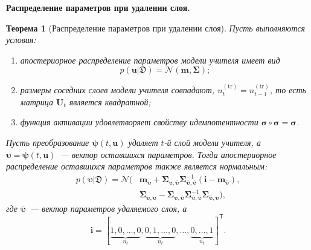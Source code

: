 \documentclass{dissert}
\newcommand{\paragraph}[1]{\noindent\textbf{#1}\quad}
\newtheorem{theorem}{Теорема}
\begin{document}
\paragraph{Распределение параметров при удалении слоя.}
\begin{theorem}[Распределение параметров при удалении слоя]
Пусть выполняются условия:
\begin{enumerate}
    \item апостериорное распределение параметров модели учителя имеет вид
    \[
        p(\mathbf{u}|\mathfrak{D})=\mathcal{N}(\mathbf{m},\boldsymbol{\Sigma});
    \]
    \item размеры соседних слоев модели учителя совпадают, $n_t^{(\mathrm{tr})}=n_{t-1}^{(\mathrm{tr})}$, то есть матрица $\mathbf{U}_t$ является квадратной;
    \item функция активации удовлетворяет свойству идемпотентности $\boldsymbol{\sigma}\circ\boldsymbol{\sigma}=\boldsymbol{\sigma}$.
\end{enumerate}
Пусть преобразование $\boldsymbol{\psi}(t,\mathbf{u})$ удаляет $t$-й слой модели учителя, а $\boldsymbol{\upsilon}=\boldsymbol{\psi}(t,\mathbf{u})$~--- вектор оставшихся параметров.
Тогда апостериорное распределение оставшихся параметров также является нормальным:
\[
\begin{aligned}
    p(\boldsymbol{\upsilon}|\mathfrak{D})
    =
    \mathcal{N}\bigl(
    &\mathbf{m}_{\boldsymbol{\upsilon}}
    +
    \boldsymbol{\Sigma}_{\boldsymbol{\upsilon},\bar{\boldsymbol{\upsilon}}}
    \boldsymbol{\Sigma}_{\bar{\boldsymbol{\upsilon}},\bar{\boldsymbol{\upsilon}}}^{-1}
    (\mathbf{i}-\mathbf{m}_{\bar{\boldsymbol{\upsilon}}}),\\
    &\boldsymbol{\Sigma}_{\boldsymbol{\upsilon},\boldsymbol{\upsilon}}
    -
    \boldsymbol{\Sigma}_{\boldsymbol{\upsilon},\bar{\boldsymbol{\upsilon}}}
    \boldsymbol{\Sigma}_{\bar{\boldsymbol{\upsilon}},\bar{\boldsymbol{\upsilon}}}^{-1}
    \boldsymbol{\Sigma}_{\bar{\boldsymbol{\upsilon}},\boldsymbol{\upsilon}}
    \bigr),
\end{aligned}
\]
где $\bar{\boldsymbol{\upsilon}}$~--- вектор параметров удаляемого слоя, а
\[
    \mathbf{i}=
    [\underbrace{1,0,\ldots,0}_{n_t},
    \underbrace{0,1,\ldots,0}_{n_t},
    \ldots,
    \underbrace{0,\ldots,1}_{n_t}]^{\mathsf{T}}.
\]
\end{theorem}
\end{document}
